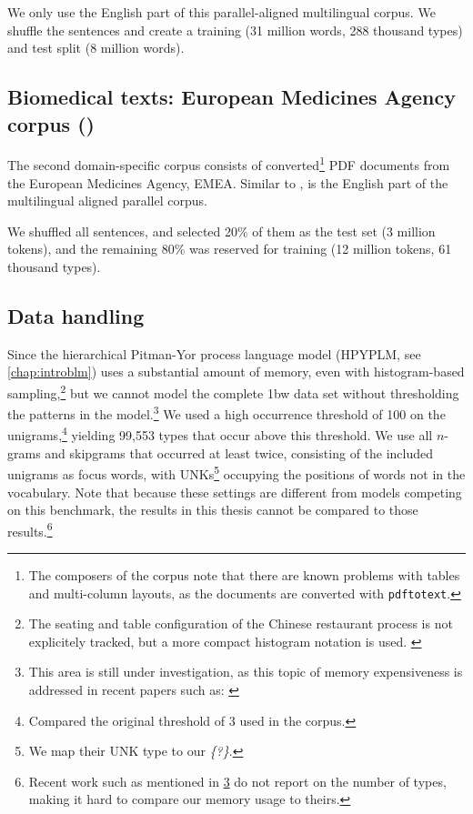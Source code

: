   We only use the English part of this parallel-aligned multilingual corpus. We shuffle the sentences and create a training (31 million words, 288 thousand types) and test split (8 million words).
    
   
  \subsection{Biomedical texts: European Medicines Agency corpus (\emea)}
  The second domain-specific corpus consists of converted\footnote{The composers of the corpus note that there are known problems with tables and multi-column layouts, as the documents are converted with \texttt{pdftotext}.} PDF documents from the European Medicines Agency, EMEA\autocite{tiedemann2009news}. Similar to \jrc, \emea is the English part of the multilingual aligned parallel corpus.
  
  We shuffled all sentences, and selected 20\% of them as the test set (3 million tokens), and the remaining 80\% was reserved for training (12 million tokens, 61 thousand types).
  
  
  \subsection{Data handling}
	Since the hierarchical Pitman-Yor process language model (HPYPLM, see \cref{chap:introblm})  uses a substantial amount of memory, even with histogram-based sampling,\footnote{The seating and table configuration of the Chinese restaurant process is not explicitely tracked, but a more compact histogram notation is used. \cite{blunsom2009note}} but we cannot model the complete 1bw data set without thresholding the patterns in the model.\footnote[][-3em]{\label{fn:shareghi}This area is still under investigation, as this topic of memory expensiveness is addressed in recent papers such as: \autocite{shareghi2017compressed}} We used a high occurrence threshold of 100 on the unigrams,\footnote{Compared the original threshold of 3 used in the corpus.} yielding 99,553 types that occur above this threshold. We use all $n$-grams and skipgrams that occurred at least twice, consisting of the included unigrams as focus words, with UNKs\footnote{We map their UNK type to our \emph{\{?\}}.} occupying the positions of words not in the vocabulary. Note that because these settings are different from models competing on this benchmark, the results in this thesis cannot be compared to those results.\footnote{Recent work such as mentioned in \cref{fn:shareghi} do not report on the number of types, making it hard to compare our memory usage to theirs.}
    
